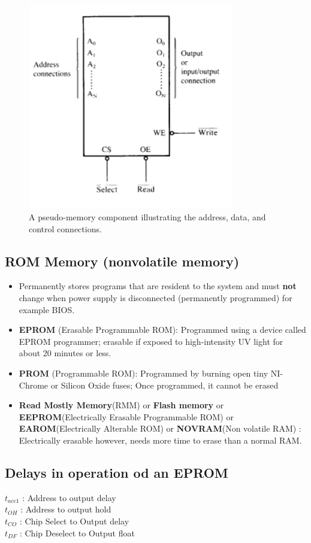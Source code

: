 \begin{figure}[h!]
  \includegraphics[width = 0.8\textwidth]{./figures/Memory.png}
  \caption{A pseudo-memory component illustrating the address, data, and control connections.}
  \label{}
\end{figure}

\subsection{ROM Memory (nonvolatile memory)}
\begin{itemize}
  \item Permanently stores programs that are resident to the system and must \textbf{not} change when power supply is disconnected (permanently programmed) for example BIOS.
  \item \textbf{EPROM} (Erasable Programmable ROM): Programmed using a device called EPROM programmer; erasable if exposed to high-intensity UV light for about 20 minutes or less.
  \item \textbf{PROM} (Programmable ROM): Programmed by burning open tiny NI-Chrome or Silicon Oxide fuses; Once programmed, it cannot be erased
  \item \textbf{Read Mostly Memory}(RMM) or \textbf{Flash memory} or \textbf{EEPROM}(Electrically Erasable Programmable ROM) or \textbf{EAROM}(Electrically Alterable ROM) or \textbf{NOVRAM}(Non volatile RAM) : Electrically erasable however, needs more time to erase than a normal RAM.
\end{itemize}
\subsection{Delays in operation od an EPROM}
$t_{acc1}$ : Address to output delay\\
$t_{OH}$ : Address to output hold\\
$t_{CO}$ : Chip Select to Output delay\\
$t_{DF}$ : Chip Deselect to Output float\\

